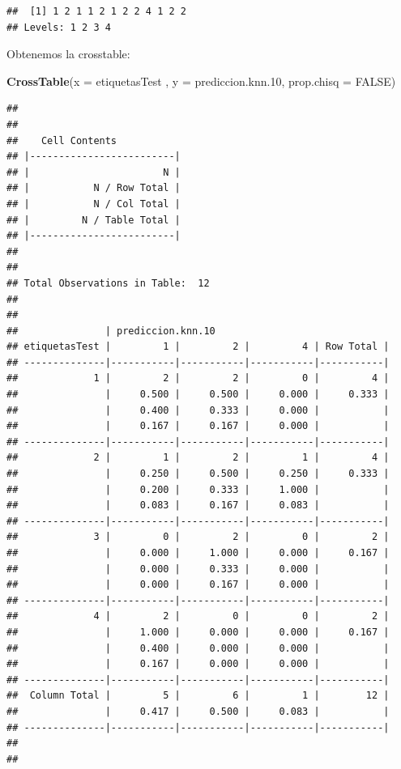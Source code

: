 \documentclass[]{article}
\newenvironment{Shaded}{\begin{snugshade}}{\end{snugshade}}
\newcommand{\KeywordTok}[1]{\textcolor[rgb]{0.13,0.29,0.53}{\textbf{#1}}}
\newcommand{\DataTypeTok}[1]{\textcolor[rgb]{0.13,0.29,0.53}{#1}}
\newcommand{\DecValTok}[1]{\textcolor[rgb]{0.00,0.00,0.81}{#1}}
\newcommand{\OtherTok}[1]{\textcolor[rgb]{0.56,0.35,0.01}{#1}}
\newcommand{\NormalTok}[1]{#1}
\begin{document}
\begin{verbatim}
##  [1] 1 2 1 1 2 1 2 2 4 1 2 2
## Levels: 1 2 3 4
\end{verbatim}

Obtenemos la crosstable:

\begin{Shaded}
\begin{Highlighting}[]
\KeywordTok{CrossTable}\NormalTok{(}\DataTypeTok{x =}\NormalTok{ etiquetasTest , }\DataTypeTok{y =}\NormalTok{ prediccion.knn.}\DecValTok{10}\NormalTok{, }\DataTypeTok{prop.chisq =} \OtherTok{FALSE}\NormalTok{)}
\end{Highlighting}
\end{Shaded}

\begin{verbatim}
## 
##  
##    Cell Contents
## |-------------------------|
## |                       N |
## |           N / Row Total |
## |           N / Col Total |
## |         N / Table Total |
## |-------------------------|
## 
##  
## Total Observations in Table:  12 
## 
##  
##               | prediccion.knn.10 
## etiquetasTest |         1 |         2 |         4 | Row Total | 
## --------------|-----------|-----------|-----------|-----------|
##             1 |         2 |         2 |         0 |         4 | 
##               |     0.500 |     0.500 |     0.000 |     0.333 | 
##               |     0.400 |     0.333 |     0.000 |           | 
##               |     0.167 |     0.167 |     0.000 |           | 
## --------------|-----------|-----------|-----------|-----------|
##             2 |         1 |         2 |         1 |         4 | 
##               |     0.250 |     0.500 |     0.250 |     0.333 | 
##               |     0.200 |     0.333 |     1.000 |           | 
##               |     0.083 |     0.167 |     0.083 |           | 
## --------------|-----------|-----------|-----------|-----------|
##             3 |         0 |         2 |         0 |         2 | 
##               |     0.000 |     1.000 |     0.000 |     0.167 | 
##               |     0.000 |     0.333 |     0.000 |           | 
##               |     0.000 |     0.167 |     0.000 |           | 
## --------------|-----------|-----------|-----------|-----------|
##             4 |         2 |         0 |         0 |         2 | 
##               |     1.000 |     0.000 |     0.000 |     0.167 | 
##               |     0.400 |     0.000 |     0.000 |           | 
##               |     0.167 |     0.000 |     0.000 |           | 
## --------------|-----------|-----------|-----------|-----------|
##  Column Total |         5 |         6 |         1 |        12 | 
##               |     0.417 |     0.500 |     0.083 |           | 
## --------------|-----------|-----------|-----------|-----------|
## 
## 
\end{verbatim}
\end{document}
